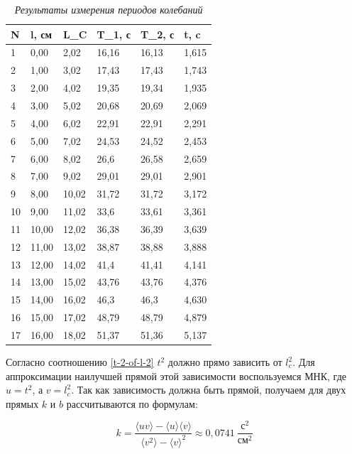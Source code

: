 \documentclass[a4paper,12pt]{article}
\begin{document}
\begin{table}[!ht]
    \centering
    \begin{tabular}{|l|l|l|l|l|l|}
    \hline
        N & l, см & L\_C & T\_1, с & T\_2, с & t, c \\ \hline
        1 & 0,00 & 2,02 & 16,16 & 16,13 & 1,615 \\ \hline
        2 & 1,00 & 3,02 & 17,43 & 17,43 & 1,743 \\ \hline
        3 & 2,00 & 4,02 & 19,35 & 19,34 & 1,935 \\ \hline
        4 & 3,00 & 5,02 & 20,68 & 20,69 & 2,069 \\ \hline
        5 & 4,00 & 6,02 & 22,91 & 22,91 & 2,291 \\ \hline
        6 & 5,00 & 7,02 & 24,53 & 24,52 & 2,453 \\ \hline
        7 & 6,00 & 8,02 & 26,6 & 26,58 & 2,659 \\ \hline
        8 & 7,00 & 9,02 & 29,01 & 29,01 & 2,901 \\ \hline
        9 & 8,00 & 10,02 & 31,72 & 31,72 & 3,172 \\ \hline
        10 & 9,00 & 11,02 & 33,6 & 33,61 & 3,361 \\ \hline
        11 & 10,00 & 12,02 & 36,38 & 36,39 & 3,639 \\ \hline
        12 & 11,00 & 13,02 & 38,87 & 38,88 & 3,888 \\ \hline
        13 & 12,00 & 14,02 & 41,4 & 41,41 & 4,141 \\ \hline
        14 & 13,00 & 15,02 & 43,76 & 43,76 & 4,376 \\ \hline
        15 & 14,00 & 16,02 & 46,3 & 46,3 & 4,630 \\ \hline
        16 & 15,00 & 17,02 & 48,79 & 48,79 & 4,879 \\ \hline
        17 & 16,00 & 18,02 & 51,37 & 51,36 & 5,137 \\ \hline
    \end{tabular}\caption{\textit{Результаты измерения периодов колебаний}}\label{period-17}
\end{table}

Согласно соотношению \eqref{t-2-of-l-2} $t^2$ должно прямо зависить от $l_c^2$. Для аппроксимации наилучшей прямой этой зависимости воспользуемся МНК, где $u = t^2$, а $v = l_c^2$. Так как зависимость должна быть прямой, получаем для двух прямых $k$ и $b$ рассчитываются по формулам:

\begin{equation}
    k = \frac{\langle uv\rangle - \langle u \rangle \langle v \rangle}{\langle v^2 \rangle - \langle v \rangle^2} \approx 0,0741 \ \frac{\text{с}^2}{\text{см}^2}
\end{equation}
\end{document}
